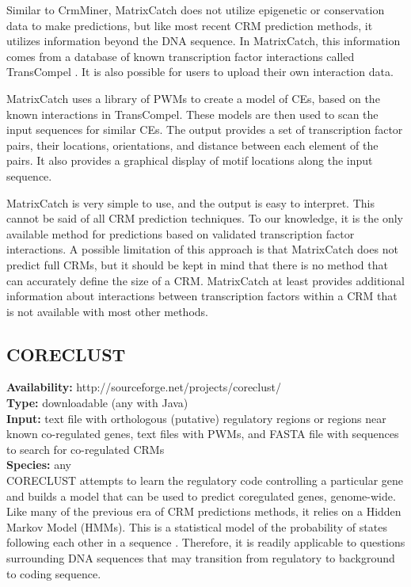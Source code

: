 \documentclass{frontiersENG} %
\begin{document}
Similar to CrmMiner, MatrixCatch does not utilize epigenetic or
conservation data to make predictions, but like most recent CRM
prediction methods, it utilizes information beyond the DNA
sequence. In MatrixCatch, this information comes from a database of
known transcription factor interactions called TransCompel
\cite{Kel-Margoulis2002}. It is also possible for users to upload
their own interaction data.

MatrixCatch uses a library of PWMs to create a model of CEs, based on
the known interactions in TransCompel. These models are then used to
scan the input sequences for similar CEs. The output provides a set of
transcription factor pairs, their locations, orientations, and
distance between each element of the pairs. It also provides a
graphical display of motif locations along the input sequence.

MatrixCatch is very simple to use, and the output is easy to
interpret. This cannot be said of all CRM prediction techniques. To
our knowledge, it is the only available method for predictions based
on validated transcription factor interactions. A possible limitation
of this approach is that MatrixCatch does not predict full CRMs, but
it should be kept in mind that there is no method that can accurately
define the size of a CRM. MatrixCatch at least provides additional
information about interactions between transcription factors within a
CRM that is not available with most other methods.

\subsection{CORECLUST}
\noindent
\textbf{Availability:} http://sourceforge.net/projects/coreclust/ \\
\textbf{Type:} downloadable (any with Java) \\
\textbf{Input:} text file with orthologous (putative) regulatory regions or regions near known co-regulated genes, text files with PWMs, and FASTA file with sequences to search for co-regulated CRMs \\
\textbf{Species:} any \\

CORECLUST \cite{Nikulova2012} attempts to learn the regulatory code
controlling a particular gene and builds a model that can be used to
predict coregulated genes, genome-wide. Like many of the previous era
of CRM predictions methods, it relies on a Hidden Markov Model
(HMMs). This is a statistical model of the probability of states
following each other in a sequence \cite{Eddy2004}. Therefore, it is
readily applicable to questions surrounding DNA sequences that may
transition from regulatory to background to coding sequence.
\end{document}
